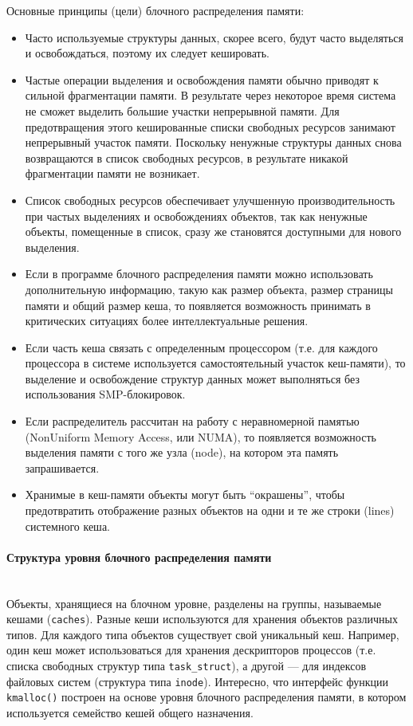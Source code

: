 \documentclass[12pt]{article}
\begin{document}
Основные принципы (цели) блочного распределения памяти:

\begin{itemize}
\item Часто используемые структуры данных, скорее всего, будут часто выделяться и
освобождаться, поэтому их следует кешировать.
\item Частые операции выделения и освобождения памяти обычно приводят к сильной фрагментации памяти. В результате через некоторое время система не
сможет выделить большие участки непрерывной памяти. Для предотвращения
этого кешированные списки свободных ресурсов занимают непрерывный участок памяти. Поскольку ненужные структуры данных снова возвращаются
в список свободных ресурсов, в результате никакой фрагментации памяти не
возникает.
\item Список свободных ресурсов обеспечивает улучшенную производительность
при частых выделениях и освобождениях объектов, так как ненужные объекты,
помещенные в список, сразу же становятся доступными для нового выделения.
\item Если в программе блочного распределения памяти можно использовать дополнительную информацию, такую как размер объекта, размер страницы памяти
и общий размер кеша, то появляется возможность принимать в критических
ситуациях более интеллектуальные решения.
\item Если часть кеша связать с определенным процессором (т.е. для каждого процессора в системе используется самостоятельный участок кеш-памяти), то выделение и освобождение структур данных может выполняться без использования SMP-блокировок.
\item Если распределитель рассчитан на работу с неравномерной памятью (NonUniform Memory Access, или NUMA), то появляется возможность выделения
памяти с того же узла (node), на котором эта память запрашивается.
\item Хранимые в кеш-памяти объекты могут быть “окрашены”, чтобы предотвратить
отображение разных объектов на одни и те же строки (lines) системного кеша.
\end{itemize}

\paragraph*{Структура уровня блочного распределения памяти} ~\\
Объекты, хранящиеся на блочном уровне, разделены на группы, называемые кешами
(\verb!caches!). Разные кеши используются для хранения объектов различных типов.
Для каждого типа объектов существует свой уникальный кеш.
Например, один кеш может использоваться для хранения дескрипторов процессов
(т.е. списка свободных структур типа \verb!task_struct!),
а другой — для индексов файловых систем (структура типа \verb!inode!).
Интересно, что интерфейс функции \verb!kmalloc()! построен на основе уровня блочного
распределения памяти, в котором используется семейство кешей общего назначения.
\end{document}
